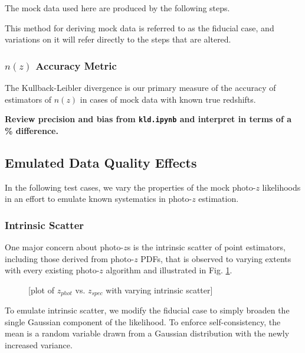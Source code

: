 \documentclass[iop]{emulateapj}
\begin{document}
The mock data used here are produced by the following steps.  

This method for deriving mock data is referred to as the fiducial case, and 
variations on it will refer directly to the steps that are altered.

\subsubsection{$n(z)$ Accuracy Metric}
\label{sec:accuracy}

The Kullback-Leibler divergence is our primary measure of the accuracy of 
estimators of $n(z)$ in cases of mock data with known true redshifts.

\textbf{Review precision and bias from \texttt{kld.ipynb} and interpret in 
terms of a \% difference.}

\subsection{Emulated Data Quality Effects}
\label{sec:likelihoods}

In the following test cases, we vary the properties of the mock photo-$z$ 
likelihoods in an effort to emulate known systematics in photo-$z$ estimation.

\subsubsection{Intrinsic Scatter}
\label{sec:intscat}

One major concern about photo-$z$s is the intrinsic scatter of point 
estimators, including those derived from photo-$z$ PDFs, that is observed to 
varying extents with every existing photo-$z$ algorithm and illustrated in Fig. 
\ref{fig:intscat}.  

\begin{figure}
	\begin{center}
		\caption{[plot of $z_{phot}$ vs. $z_{spec}$ with varying 
intrinsic scatter]}
		\label{fig:intscat}
	\end{center}
\end{figure}

To emulate intrinsic scatter, we modify the fiducial case to simply broaden the 
single Gaussian component of the likelihood.  To enforce self-consistency, the 
mean is a random variable drawn from a Gaussian distribution with the newly 
increased variance.
\end{document}

